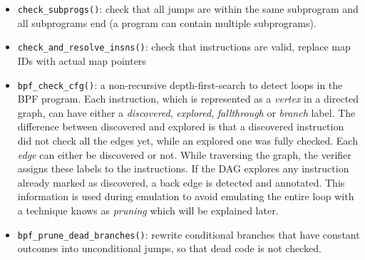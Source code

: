 \begin{itemize}



    \item \verb|check_subprogs()|: check that all jumps are within the same
      subprogram and all subprograms end (a program can contain multiple
      subprograms).


    \item \verb|check_and_resolve_insns()|: check that instructions are valid,
      replace map IDs with actual map pointers


    \item \verb|bpf_check_cfg()|:  a non-recursive depth-first-search to detect
      loops in the BPF program. Each instruction, which is represented as a
      \textit{vertex} in a directed graph, can have either a
      \textit{discovered}, \textit{explored}, \textit{fallthrough} or
      \textit{branch} label. The difference between discovered and explored is
      that a discovered instruction did not check all the edges yet, while an
      explored one was fully checked. Each \textit{edge} can either be
      discovered or not. While traversing the graph, the verifier assigns these
      labels to the instructions. If the DAG explores any instruction already
      marked as discovered, a back edge is detected and annotated. This
      information is used during emulation to avoid emulating the entire loop
      with a technique knows as \textit{pruning} which will be explained later.





    \item \verb|bpf_prune_dead_branches()|: rewrite conditional branches that
      have constant outcomes into unconditional jumps, so that dead code is not
      checked.


\end{itemize}
